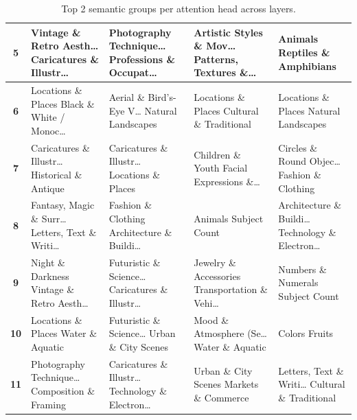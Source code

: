 \begin{table}[ht]
\begin{tabularx}{\textwidth}{|c|*{4}{>{\raggedright\arraybackslash}X|}}
\textbf{5} & Vintage \& Retro Aesth… \newline Caricatures \& Illustr… & Photography Technique… \newline Professions \& Occupat… & Artistic Styles \& Mov… \newline Patterns, Textures \&… & Animals \newline Reptiles \& Amphibians \\
\hline
\textbf{6} & Locations \& Places \newline Black \& White / Monoc… & Aerial \& Bird's-Eye V… \newline Natural Landscapes & Locations \& Places \newline Cultural \& Traditional & Locations \& Places \newline Natural Landscapes \\
\hline
\textbf{7} & Caricatures \& Illustr… \newline Historical \& Antique & Caricatures \& Illustr… \newline Locations \& Places & Children \& Youth \newline Facial Expressions \&… & Circles \& Round Objec… \newline Fashion \& Clothing \\
\hline
\textbf{8} & Fantasy, Magic \& Surr… \newline Letters, Text \& Writi… & Fashion \& Clothing \newline Architecture \& Buildi… & Animals \newline Subject Count & Architecture \& Buildi… \newline Technology \& Electron… \\
\hline
\textbf{9} & Night \& Darkness \newline Vintage \& Retro Aesth… & Futuristic \& Science… \newline Caricatures \& Illustr… & Jewelry \& Accessories \newline Transportation \& Vehi… & Numbers \& Numerals \newline Subject Count \\
\hline
\textbf{10} & Locations \& Places \newline Water \& Aquatic & Futuristic \& Science… \newline Urban \& City Scenes & Mood \& Atmosphere (Se… \newline Water \& Aquatic & Colors \newline Fruits \\
\hline
\textbf{11} & Photography Technique… \newline Composition \& Framing & Caricatures \& Illustr… \newline Technology \& Electron… & Urban \& City Scenes \newline Markets \& Commerce & Letters, Text \& Writi… \newline Cultural \& Traditional \\
\hline
\end{tabularx}
\caption{Top 2 semantic groups per attention head across layers.}
\label{tab:head_semantics}
\end{table}